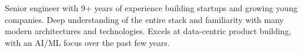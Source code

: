 

\begin{cvparagraph}

Senior engineer with 9+ years of experience building startups and growing young companies. Deep understanding of the entire stack and familiarity with many modern architectures and technologies. Excels at data-centric product building, with an AI/ML focus over the past few years.
\end{cvparagraph}
